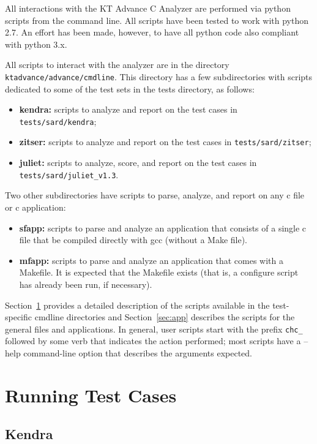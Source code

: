 \documentclass[11pt]{article}
\begin{document}
All interactions with the KT Advance C Analyzer are performed via python scripts from the
command line. All scripts have been tested to work with python 2.7. An effort has been
made, however, to have all python code also compliant with python 3.x.

All scripts to interact with the analyzer are in the directory 
{\tt ktadvance/advance/cmdline}. 
This directory has a few subdirectories with scripts dedicated to some of the test 
sets in the tests directory, as follows:
\begin{itemize}
\item {\bf kendra:} scripts to analyze and report on the test cases in 
 {\tt tests/sard/kendra};
\item {\bf zitser:} scripts to analyze and report on the test cases in
 {\tt tests/sard/zitser};
\item {\bf juliet:} scripts to analyze, score, and report on the test cases in
 {\tt tests/sard/juliet\_v1.3}.
\end{itemize}

Two other subdirectories have scripts to parse, analyze, and report on any c file or
c application:
\begin{itemize}
\item {\bf sfapp:} scripts to parse and analyze an application that consists of a single
  c file that be compiled directly with gcc (without a Make file). 
\item {\bf mfapp:} scripts to parse and analyze an application that comes with a Makefile.
  It is expected that the Makefile exists (that is, a configure script has already been
  run, if necessary).
\end{itemize}

Section~\ref{sec:tests} provides a detailed description of the scripts available in
the test-specific cmdline directories and Section~\ref{sec:app} describes the scripts
for the general files and applications. In general, user scripts start with the 
prefix {\tt chc\_} followed by some verb that indicates the action performed; most 
scripts have a --help command-line
option that describes the arguments expected.

\section{Running Test Cases}
\label{sec:tests}

\subsection{Kendra}
\end{document}

